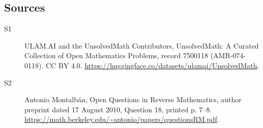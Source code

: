 \documentclass[11pt]{article}
\begin{document}
\subsection{Sources}
\begin{description}
\item[\hypertarget{source:7500118:1}{S1}] ULAM.AI and the UnsolvedMath Contributors, UnsolvedMath: A Curated Collection of Open Mathematics Problems, record 7500118 (AMR-074-0118). CC BY 4.0. \url{https://huggingface.co/datasets/ulamai/UnsolvedMath}.
\item[\hypertarget{source:7500118:2}{S2}] Antonio Montalbán, Open Questions in Reverse Mathematics, author preprint dated 17 August 2010, Question 18, printed p. 7--8. \url{https://math.berkeley.edu/~antonio/papers/questionsRM.pdf}.
\end{description}
\label{end:7500118}
\end{document}
